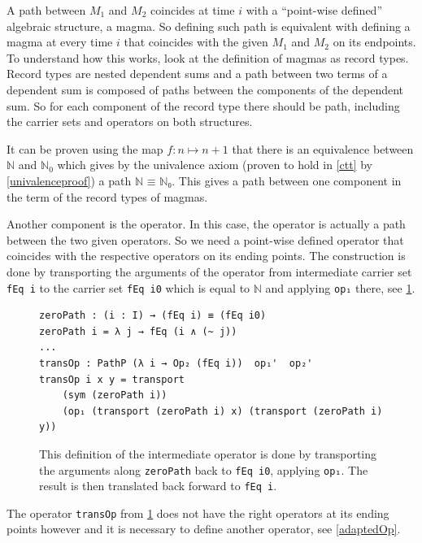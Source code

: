 \documentclass[11pt,a4paper,twoside,xetex,draft]{book}
\begin{document}
A path between $M_1$ and $M_2$ coincides at time $i$ with a ``point-wise defined'' algebraic structure, a magma. So defining such path is equivalent with defining a magma at every time $i$ that coincides with the given $M_1$ and $M_2$ on its endpoints. To understand how this works, look at the definition of magmas as record types. Record types are nested dependent sums and a path between two terms of a dependent sum is composed of paths between the components of the dependent sum. So for each component of the record type there should be path, including the carrier sets and operators on both structures. 

It can be proven using the map $f: n \mapsto n + 1$ that there is an equivalence between $\mathbb{N}$ and $\mathbb{N}_0$ which gives by the univalence axiom (proven to hold in \cref{ctt} by \cref{univalenceproof}) a path $\texttt{ℕ ≡ ℕ₀}$. This gives a path between one component in the term of the record types of magmas. 

Another component is the operator. In this case, the operator is actually a path between the two given operators. So we need a point-wise defined operator that coincides with the respective operators on its ending points. The construction is done by transporting the arguments of the operator from intermediate carrier set \texttt{fEq i} to the carrier set \texttt{fEq i0} which is equal to $\mathbb{N}$ and applying \texttt{op₁} there, see \cref{zeroPathLift}.


\begin{figure}\label{zeroPathLift}
\centering 
\begin{BVerbatim}
zeroPath : (i : I) → (fEq i) ≡ (fEq i0)
zeroPath i = λ j → fEq (i ∧ (~ j))
...
transOp : PathP (λ i → Op₂ (fEq i))  op₁'  op₂' 
transOp i x y = transport 
    (sym (zeroPath i))
    (op₁ (transport (zeroPath i) x) (transport (zeroPath i) y))
\end{BVerbatim}
\caption{This definition of the intermediate operator is done by transporting the arguments along \texttt{zeroPath} back to \texttt{fEq i0}, applying \texttt{op₁}. The result is then translated back forward to \texttt{fEq i}.}

\end{figure}

The operator \texttt{transOp} from \cref{zeroPathLift} does not have the right operators at its ending points however and it is necessary to define another operator, see \cref{adaptedOp}.
\end{document}

